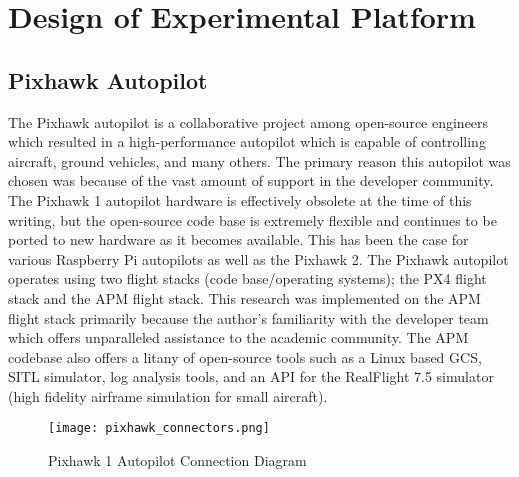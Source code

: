 \chapter{Design of Experimental Platform}\label{ch:platform}

\section{Pixhawk Autopilot}
The Pixhawk autopilot is a collaborative project among open-source engineers which resulted in a high-performance autopilot which is capable of controlling aircraft, ground vehicles, and many others.  The primary reason this autopilot was chosen was because of the vast amount of support in the developer community.  The Pixhawk 1 autopilot hardware is effectively obsolete at the time of this writing, but the open-source code base is extremely flexible and continues to be ported to new hardware as it becomes available.  This has been the case for various Raspberry Pi autopilots as well as the Pixhawk 2.  The Pixhawk autopilot operates using two flight stacks (code base/operating systems); the PX4 flight stack and the \ac{APM} flight stack.  This research was implemented on the \ac{APM} flight stack primarily because the author's familiarity with the developer team which offers unparalleled assistance to the academic community.  The \ac{APM} codebase also offers a litany of open-source tools such as a Linux based \ac{GCS}, \ac{SITL} simulator, log analysis tools, and an \ac{API} for the RealFlight 7.5 simulator (high fidelity airframe simulation for small aircraft).

\begin{figure}[h!]
 \centering
  \texttt{[image: pixhawk\_connectors.png]}
  \caption{Pixhawk 1 Autopilot Connection Diagram}
  \label{fig:pixhawk_autopilot}
\end{figure}

